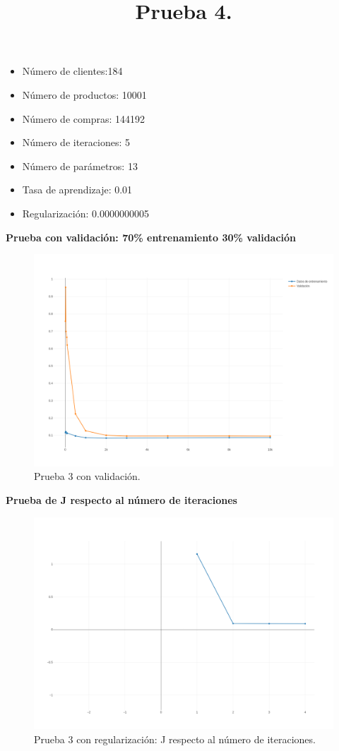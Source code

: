 {{{{{%
\title{\textbf{Prueba 4.}}

\begin{itemize}
\item Número de clientes:184
\item Número de productos: 10001
\item Número de compras: 144192
\item Número de iteraciones: 5
\item Número de parámetros: 13
\item Tasa de aprendizaje: 0.01
\item Regularización: 0.0000000005
\end{itemize}
\newpage
\textbf{Prueba con validación: 70\% entrenamiento 30\% validación}

\FloatBarrier
\begin{figure}[htbp!]
		\centering
			\includegraphics[width=1 \textwidth]{imagenes/pruebassistemarecom/5_0000000005_13}
		\caption{Prueba 3 con validación.}
		\label{pruebabien}
\end{figure}
\FloatBarrier
\newpage
\textbf{Prueba de J respecto al número de iteraciones}

\FloatBarrier
\begin{figure}[htbp!]
		\centering
			\includegraphics[width=1 \textwidth]{imagenes/pruebassistemarecom/2_4}
		\caption{Prueba 3 con regularización: J respecto al número de iteraciones.}
		\label{gradiente_desc}
\end{figure}
\FloatBarrier

}}}}}
